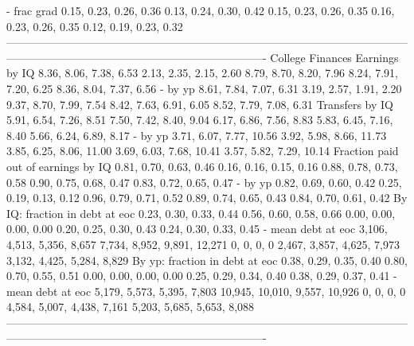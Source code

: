                            - frac grad      0.15, 0.23, 0.26, 0.36         0.13, 0.24, 0.30, 0.42   0.15, 0.23, 0.26, 0.35      0.16, 0.23, 0.26, 0.35      0.12, 0.19, 0.23, 0.32
----------------------------------------------------------------------------------------------------------------------------------------------------------------------------------
                      College Finances                                                                                                                                            
                        Earnings by IQ      8.36, 8.06, 7.38, 6.53         2.13, 2.35, 2.15, 2.60   8.79, 8.70, 8.20, 7.96      8.24, 7.91, 7.20, 6.25      8.36, 8.04, 7.37, 6.56
                               - by yp      8.61, 7.84, 7.07, 6.31         3.19, 2.57, 1.91, 2.20   9.37, 8.70, 7.99, 7.54      8.42, 7.63, 6.91, 6.05      8.52, 7.79, 7.08, 6.31
                       Transfers by IQ      5.91, 6.54, 7.26, 8.51         7.50, 7.42, 8.40, 9.04   6.17, 6.86, 7.56, 8.83      5.83, 6.45, 7.16, 8.40      5.66, 6.24, 6.89, 8.17
                               - by yp     3.71, 6.07, 7.77, 10.56        3.92, 5.98, 8.66, 11.73  3.85, 6.25, 8.06, 11.00     3.69, 6.03, 7.68, 10.41     3.57, 5.82, 7.29, 10.14
   Fraction paid out of earnings by IQ      0.81, 0.70, 0.63, 0.46         0.16, 0.16, 0.15, 0.16   0.88, 0.78, 0.73, 0.58      0.90, 0.75, 0.68, 0.47      0.83, 0.72, 0.65, 0.47
                               - by yp      0.82, 0.69, 0.60, 0.42         0.25, 0.19, 0.13, 0.12   0.96, 0.79, 0.71, 0.52      0.89, 0.74, 0.65, 0.43      0.84, 0.70, 0.61, 0.42
        By IQ: fraction in debt at eoc      0.23, 0.30, 0.33, 0.44         0.56, 0.60, 0.58, 0.66   0.00, 0.00, 0.00, 0.00      0.20, 0.25, 0.30, 0.43      0.24, 0.30, 0.33, 0.45
                    - mean debt at eoc  3,106, 4,513, 5,356, 8,657    7,734, 8,952, 9,891, 12,271               0, 0, 0, 0  2,467, 3,857, 4,625, 7,973  3,132, 4,425, 5,284, 8,829
        By yp: fraction in debt at eoc      0.38, 0.29, 0.35, 0.40         0.80, 0.70, 0.55, 0.51   0.00, 0.00, 0.00, 0.00      0.25, 0.29, 0.34, 0.40      0.38, 0.29, 0.37, 0.41
                    - mean debt at eoc  5,179, 5,573, 5,395, 7,803  10,945, 10,010, 9,557, 10,926               0, 0, 0, 0  4,584, 5,007, 4,438, 7,161  5,203, 5,685, 5,653, 8,088
----------------------------------------------------------------------------------------------------------------------------------------------------------------------------------
